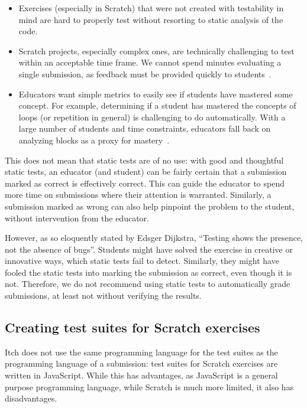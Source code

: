 \documentclass[../main]{subfiles}
\begin{document}
\begin{itemize}
    \item Exercises (especially in Scratch) that were not created with testability in mind are hard to properly test without resorting to static analysis of the code.
    \item Scratch projects, especially complex ones, are technically challenging to test within an acceptable time frame.
        We cannot spend minutes evaluating a single submission, as feedback must be provided quickly to students~\autocite{sarsaSpeedingAutomatedAssessment2022}.
    \item Educators want simple metrics to easily see if students have mastered some concept.
          For example, determining if a student has mastered the concepts of loops (or repetition in general) is challenging to do automatically.
          With a large number of students and time constraints, educators fall back on analyzing blocks as a proxy for mastery~\autocite{combefisAutomatedCodeAssessment2022}.
\end{itemize}

This does not mean that static tests are of no use: with good and thoughtful static tests, an educator (and student) can be fairly certain that a submission marked as correct is effectively correct.
This can guide the educator to spend more time on submissions where their attention is warranted.
Similarly, a submission marked as wrong can also help pinpoint the problem to the student, without intervention from the educator.

However, as so eloquently stated by Edsger Dijkstra, ``Testing shows the presence, not the absence of bugs''.
Students might have solved the exercise in creative or innovative ways, which static tests fail to detect.
Similarly, they might have fooled the static tests into marking the submission as correct, even though it is not.
Therefore, we do not recommend using static tests to automatically grade submissions, at least not without verifying the results.

\subsection{Creating test suites for Scratch exercises}\label{subsec:creating-test-suites-for-scratch-exercises}

Itch does not use the same programming language for the test suites as the programming language of a submission: test suites for Scratch exercises are written in JavaScript.
While this has advantages, as JavaScript is a general purpose programming language, while Scratch is much more limited, it also has disadvantages.
\end{document}
